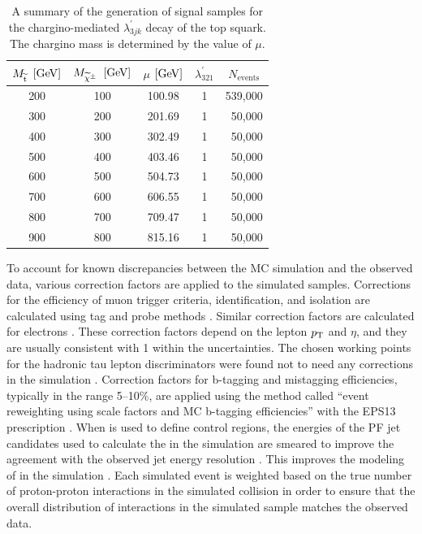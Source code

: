 \begin{table}[htb]
  \begin{center}
    \begin{tabular}{|c|c|c|c|r|}
\hline
$M_{\widetilde{\mathrm{t}}}$ $[\text{Ge\hspace{-.08em}V}]$    &    $M_{\widetilde{\chi}^{\pm}}$ $[\text{Ge\hspace{-.08em}V}]$    &   $\mu$ $[\text{Ge\hspace{-.08em}V}]$  & $\lambda_{321}^{\prime}$ & \multicolumn{1}{c|}{$N_{\text{events}}$} \\
\hline \hline
200   &      100   &  100.98 & 1  &   539,000   \\
300   &      200   &  201.69 & 1  &   50,000   \\
400   &      300   &  302.49 & 1  &   50,000   \\
500   &      400   &  403.46 & 1  &   50,000   \\
600   &      500   &  504.73 & 1  &   50,000   \\
700   &      600   &  606.55 & 1  &   50,000   \\
800   &      700   &  709.47 & 1  &   50,000   \\
900   &      800   &  815.16 & 1  &   50,000   \\
\hline
\end{tabular}
\caption{A summary of the generation of signal samples for the chargino-mediated $\lambda_{3jk}^{\prime}$ decay of the top squark. The chargino mass is determined by the value of $\mu$.}
\label{tab:LQD321-samples}
\end{center}
\end{table}

To account for known discrepancies between the MC simulation and the observed data, various correction factors are applied to the simulated samples. Corrections for the efficiency of muon trigger criteria, identification, and isolation are calculated using tag and probe methods \cite{MuonRefEffs}. Similar correction factors are calculated for electrons \cite{EgammaTagAndProbe,EgammaScaleFactors}. These correction factors depend on the lepton $p_{\mathrm{T}}$ and $\eta$, and they are usually consistent with 1 within the uncertainties. The chosen working points for the hadronic tau lepton discriminators were found not to need any corrections in the simulation \cite{TauID}. Correction factors for b-tagging and mistagging efficiencies, typically in the range 5--10\%, are applied using the method called ``event reweighting using scale factors and MC b-tagging efficiencies'' with the EPS13 prescription \cite{BTagSFMethods}. When \met is used to define control regions, the energies of the PF jet candidates used to calculate the \met in the simulation are smeared to improve the agreement with the observed jet energy resolution \cite{CMS-JEC}. This improves the modeling of \met in the simulation \cite{CMS-AN-2012-333}. Each simulated event is weighted based on the true number of proton-proton interactions in the simulated collision in order to ensure that the overall distribution of interactions in the simulated sample matches the observed data.